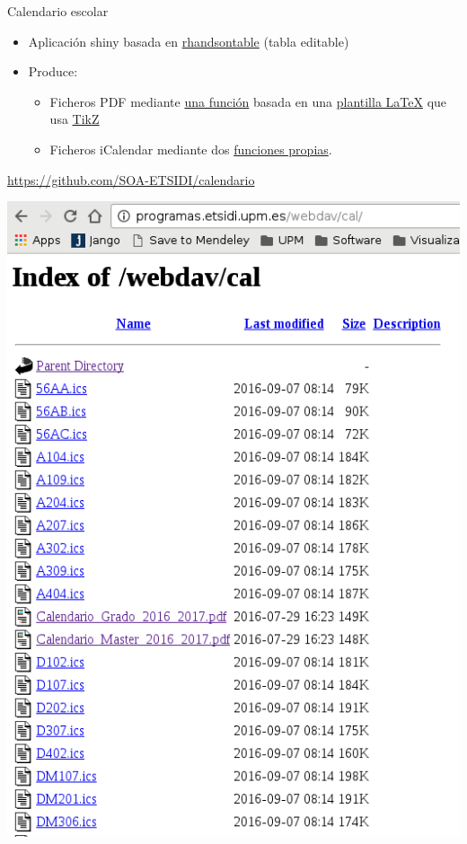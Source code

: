 \documentclass[spanish, xcolor={usenames,svgnames,dvipsnames}]{beamer}
\begin{document}
\begin{frame}[label={sec:orgb65c6a2}]{Calendario escolar}
\begin{itemize}
\item Aplicación shiny basada en \href{http://jrowen.github.io/rhandsontable/}{rhandsontable} (tabla editable)
\item Produce:
\begin{itemize}
\item Ficheros PDF mediante \href{https://github.com/SOA-ETSIDI/calendario/blob/master/csv2pdf.R}{una función} basada en una \href{https://github.com/SOA-ETSIDI/calendario/blob/master/documentCal.tex}{plantilla \LaTeX{}} que usa \href{https://en.wikipedia.org/wiki/PGF/TikZ}{TikZ}
\item Ficheros iCalendar mediante dos \href{https://github.com/SOA-ETSIDI/calendario/blob/master/csv2ics.R}{funciones propias}.
\end{itemize}
\end{itemize}
\begin{block}{}
\url{https://github.com/SOA-ETSIDI/calendario}
\end{block}
\end{frame}

\begin{frame}[label={sec:org981d284}]{}
\begin{center}
\includegraphics[width=.9\linewidth]{images/webdav_cal.png}
\end{center}
\end{frame}
\end{document}
